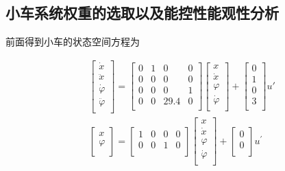 \subsection{小车系统权重的选取以及能控性能观性分析}

前面得到小车的状态空间方程为

\begin{equation}
\begin{aligned}
&\begin{bmatrix}
\dot x\\
\ddot x\\
\dot{\varphi}\\
\ddot{\varphi}\\
\end{bmatrix}
=
\begin{bmatrix}
0 & 1 & 0 & 0\\
0 & 0 & 0 & 0\\
0 & 0 & 0 & 1\\
0 & 0 & 29.4 & 0\\
\end{bmatrix}
\begin{bmatrix}
x\\
\dot x\\
\varphi\\
\dot{\varphi}\\
\end{bmatrix}
+
\begin{bmatrix}
0\\
1\\
0\\
3\\
\end{bmatrix}
u'\\
&\begin{bmatrix}
x\\
\varphi\\
\end{bmatrix}
=
\begin{bmatrix}
1 &0 &0 &0\\
0 &0 &1 &0\\
\end{bmatrix}
\begin{bmatrix}
x\\
\dot x\\
\varphi\\
\dot{\varphi}\\
\end{bmatrix}
+
\begin{bmatrix}
0\\
0\\
\end{bmatrix}
u^{'}\\
\end{aligned}
\end{equation}

